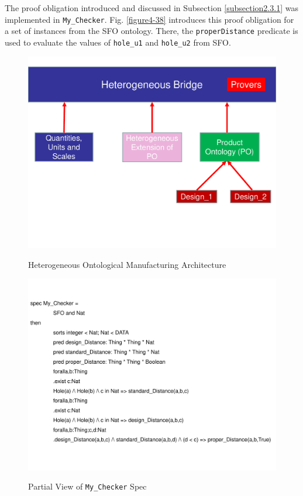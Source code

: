The proof obligation introduced and discussed  in Subsection   \ref{subsection2.3.1} was implemented in \texttt{My\_Checker}. Fig. \ref{figure4-38} introduces this proof obligation for a set of instances from the SFO ontology. There, the \texttt{properDistance} predicate is used to evaluate the values of \texttt{hole\_u1} and \texttt{hole\_u2} from SFO. 


\begin{figure}
\begin{center}
	\includegraphics[scale=0.5]{figure-chapterIV/fig4-36.pdf}\\
	\vspace{-40}
	\caption{Heterogeneous Ontological Manufacturing Architecture }
	\label{figure4-36}
\end{center}
\end{figure}



\begin{figure}

\begin{center}
	\includegraphics[scale=0.7, angle=90]{figure-chapterIV/fig4-37.pdf}\\
	\caption{Partial View of \texttt{My\_Checker} Spec}
	\label{figure4-37}
\end{center}

\end{figure}


